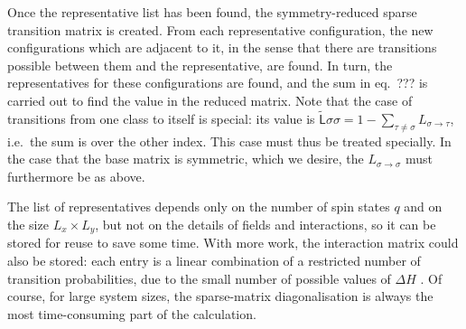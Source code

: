 \documentclass[10pt]{article}
\newcommand{\LL}{\mathsf{L}}
\newcommand{\tL}{\tilde{\LL}}
\renewcommand{\L}[2]{L_{#2 \to #1}}  %
\begin{document}
Once the representative list has been found, the symmetry-reduced
sparse transition matrix is created. From each representative configuration,
the new configurations which are adjacent to it, in the sense that there are
transitions possible between them and the representative, are found. In turn,
the representatives for these configurations are found, and the sum in eq.~???
is carried out to find the value in the reduced matrix.  Note that the case of
transitions from one class to itself is special: its value is
$\tL{\sigma}{\sigma} = 1-\sum_{\tau \neq \sigma} \L{\tau}{\sigma}$, i.e.\ the
sum is over the other index. This case must thus be treated specially.  In the
case that the base matrix is symmetric, which we desire, the
$\L{\sigma}{\sigma}$ must furthermore be as above.

The list of representatives depends only on the number of spin states $q$ and
on the size $L_x \times L_y$, but not on the details of fields and
interactions, so it can be stored for reuse to save some time. With more work,
the interaction matrix could also be stored: each entry is a linear combination
of a restricted number of transition probabilities, due to the small number of
possible values of $\Delta H$ \cite{NewmanBarkemaBook}.
Of course, for large system sizes, the sparse-matrix diagonalisation is always
the most time-consuming part of the calculation.


%
%




\end{document}
